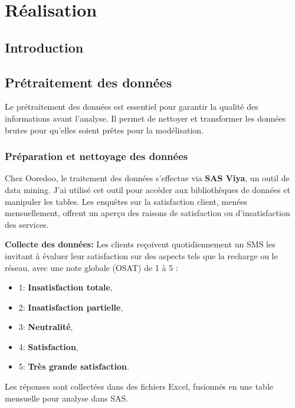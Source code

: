 \chapter{Réalisation}
\begin{spacing}{1.2}
\minitoc
\thispagestyle{MyStyle}
\end{spacing}
\newpage
\justifying

\sloppy {} 
\section{Introduction}
\section{Prétraitement des données}

Le prétraitement des données est essentiel pour garantir la qualité des informations avant l'analyse. Il permet de nettoyer et transformer les données brutes pour qu'elles soient prêtes pour la modélisation.

\subsection{Préparation et nettoyage des données}

Chez Ooredoo, le traitement des données s'effectue via \textbf{SAS Viya}, un outil de data mining. J'ai utilisé cet outil pour accéder aux bibliothèques de données et manipuler les tables. Les enquêtes sur la satisfaction client, menées mensuellement, offrent un aperçu des raisons de satisfaction ou d'insatisfaction des services.

\textbf{Collecte des données:}
Les clients reçoivent quotidiennement un SMS les invitant à évaluer leur satisfaction sur des aspects tels que la recharge ou le réseau, avec une note globale (OSAT) de 1 à 5 :
\begin{itemize}
    \item 1: \textbf{Insatisfaction totale},
    \item 2: \textbf{Insatisfaction partielle},
    \item 3: \textbf{Neutralité},
    \item 4: \textbf{Satisfaction},
    \item 5: \textbf{Très grande satisfaction}.
\end{itemize}

Les réponses sont collectées dans des fichiers Excel, fusionnés en une table mensuelle pour analyse dans SAS.

